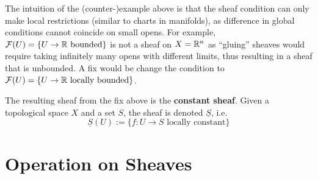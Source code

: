 \documentclass{article}
\begin{document}
\nogap
\begin{remark}
    The intuition of the (counter-)example above is that the sheaf condition can only make local restrictions (similar to charts in manifolds), as difference in global conditions cannot coincide on small opens. For example, $\mathcal{F}(U) = \{ U \to \mathbb{R} \text{ bounded} \}$ is not a sheaf on $X = \mathbb{R}^n$ as ``gluing'' sheaves would require taking infinitely many opens with different limits, thus resulting in a sheaf that is unbounded. A fix would be change the condition to $\mathcal{F}(U) = \{ U \to \mathbb{R} \text{ locally bounded} \}$.
\end{remark}

\begin{definition}
    The resulting sheaf from the fix above is the \textbf{constant sheaf}. Given a topological space $X$ and a set $S$, the sheaf is denoted $\underline{S}$, i.e.
    \[
        \underline{S}(U) := \{ f: U \to S \text{ locally constant} \}
    \]
\end{definition}

\section{Operation on Sheaves}
\end{document}

